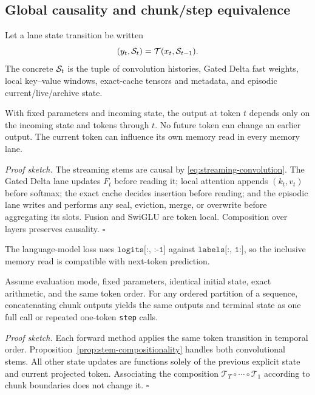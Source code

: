 \subsection{Global causality and chunk/step equivalence}
\label{subsec:causality-chunking}

Let a lane state transition be written
\[
  (y_t,\mathcal{S}_t)=\mathcal T(x_t,\mathcal{S}_{t-1}).
\]
The concrete \(\mathcal{S}_t\) is the tuple of convolution histories, Gated Delta
fast weights, local key--value windows, exact-cache tensors and metadata, and
episodic current/live/archive state.

\begin{proposition}
\label{prop:global-causality}
With fixed parameters and incoming state, the output at token \(t\) depends
only on the incoming state and tokens through \(t\).  No future token can
change an earlier output.  The current token can influence its own memory
read in every memory lane.
\end{proposition}
\noindent\emph{Proof sketch.}
The streaming stems are causal by
\eqref{eq:streaming-convolution}.  The Gated Delta lane updates \(F_t\) before
reading it; local attention appends \((k_t,v_t)\) before softmax; the exact
cache decides insertion before reading; and the episodic lane writes and
performs any seal, eviction, merge, or overwrite before aggregating its slots.
Fusion and SwiGLU are token local.  Composition over layers preserves
causality. \hfill\(\square\)

The language-model loss uses
\(\texttt{logits[:, :-1]}\) against \(\texttt{labels[:, 1:]}\), so the
inclusive memory read is compatible with next-token prediction.

\begin{proposition}
\label{prop:chunk-step}
Assume evaluation mode, fixed parameters, identical initial state, exact
arithmetic, and the same token order.  For any ordered partition of a sequence,
concatenating chunk outputs yields the same outputs and terminal state as one
full call or repeated one-token \texttt{step} calls.
\end{proposition}
\noindent\emph{Proof sketch.}
Each forward method applies the same token transition in temporal order.
Proposition~\ref{prop:stem-compositionality} handles both convolutional stems.
All other state updates are functions solely of the previous explicit state
and current projected token.  Associating the composition
\(\mathcal T_T\circ\cdots\circ\mathcal T_1\) according to chunk boundaries
does not change it. \hfill\(\square\)

